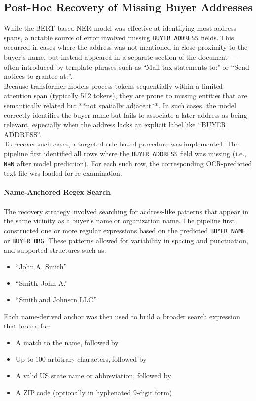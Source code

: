 \documentclass{article}
\begin{document}
\subsection{Post-Hoc Recovery of Missing Buyer Addresses}

While the BERT-based NER model was effective at identifying most address spans, a notable source of error involved missing \texttt{BUYER ADDRESS} fields. This occurred in cases where the address was not mentioned in close proximity to the buyer's name, but instead appeared in a separate section of the document — often introduced by template phrases such as ``Mail tax statements to:'' or ``Send notices to grantee at:''. \\

Because transformer models process tokens sequentially within a limited attention span (typically 512 tokens), they are prone to missing entities that are semantically related but **not spatially adjacent**. In such cases, the model correctly identifies the buyer name but fails to associate a later address as being relevant, especially when the address lacks an explicit label like ``BUYER ADDRESS''. \\

To recover such cases, a targeted rule-based procedure was implemented. The pipeline first identified all rows where the \texttt{BUYER ADDRESS} field was missing (i.e., \texttt{NaN} after model prediction). For each such row, the corresponding OCR-predicted text file was loaded for re-examination. \\

\paragraph{Name-Anchored Regex Search.}
The recovery strategy involved searching for address-like patterns that appear in the same vicinity as a buyer's name or organization name. The pipeline first constructed one or more regular expressions based on the predicted \texttt{BUYER NAME} or \texttt{BUYER ORG}. These patterns allowed for variability in spacing and punctuation, and supported structures such as:
\begin{itemize}
    \item ``John A. Smith''
    \item ``Smith, John A.''
    \item ``Smith and Johnson LLC''
\end{itemize}

Each name-derived anchor was then used to build a broader search expression that looked for:
\begin{itemize}
    \item A match to the name, followed by
    \item Up to 100 arbitrary characters, followed by
    \item A valid US state name or abbreviation, followed by
    \item A ZIP code (optionally in hyphenated 9-digit form)
\end{itemize}
\end{document}
